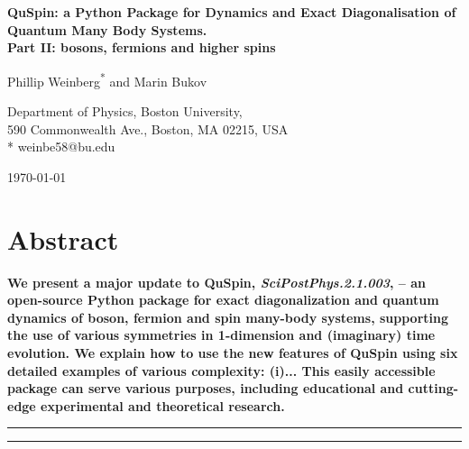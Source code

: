 \documentclass{SciPost}
\newcommand\0{\scalebox{-1}[1]{0}}
\begin{document}
\begin{center}{\Large \textbf{
QuSpin: a Python Package for Dynamics and Exact Diagonalisation of Quantum Many Body Systems.\\
\large Part II: bosons, fermions and higher spins
}}\end{center}

\begin{center}
Phillip Weinberg\textsuperscript{*} and Marin Bukov
\end{center}

\begin{center}
Department of Physics, Boston University, \\
590 Commonwealth Ave., Boston, MA 02215, USA
\\
* weinbe58@bu.edu
\end{center}

\begin{center}
\today
\end{center}


\section*{Abstract}
{\bf 
We present a major update to QuSpin, \emph{SciPostPhys.2.1.003}, -- an open-source Python package for exact diagonalization and quantum dynamics of boson, fermion and spin many-body systems, supporting the use of various symmetries in 1-dimension and (imaginary) time evolution. We explain how to use the new features of QuSpin using six detailed examples of various complexity: (i)... This easily accessible package can serve various purposes, including educational and cutting-edge experimental and theoretical research.
}


\vspace{10pt}
\noindent\rule{\textwidth}{1pt}
\tableofcontents\thispagestyle{fancy}
\noindent\rule{\textwidth}{1pt}
\vspace{10pt}
\end{document}
